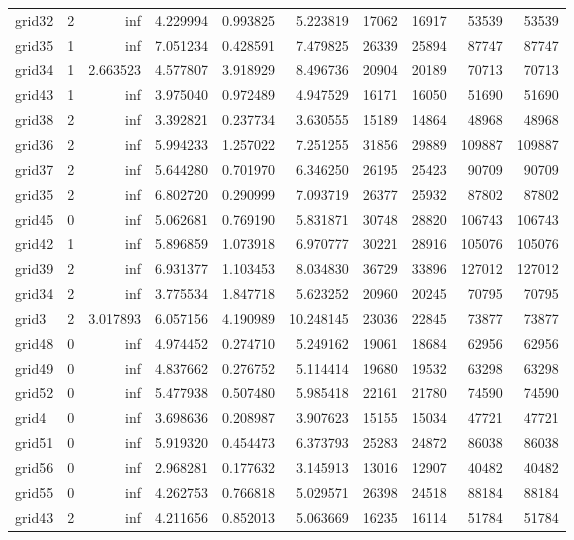 \begin{longtable}{|l|r|r|r|r|r|r|r|r|r|}
grid32 & 2 & inf & 4.229994 & 0.993825 & 5.223819 & 17062 & 16917 & 53539 & 53539 \\
grid35 & 1 & inf & 7.051234 & 0.428591 & 7.479825 & 26339 & 25894 & 87747 & 87747 \\
grid34 & 1 & 2.663523 & 4.577807 & 3.918929 & 8.496736 & 20904 & 20189 & 70713 & 70713 \\
grid43 & 1 & inf & 3.975040 & 0.972489 & 4.947529 & 16171 & 16050 & 51690 & 51690 \\
grid38 & 2 & inf & 3.392821 & 0.237734 & 3.630555 & 15189 & 14864 & 48968 & 48968 \\
grid36 & 2 & inf & 5.994233 & 1.257022 & 7.251255 & 31856 & 29889 & 109887 & 109887 \\
grid37 & 2 & inf & 5.644280 & 0.701970 & 6.346250 & 26195 & 25423 & 90709 & 90709 \\
grid35 & 2 & inf & 6.802720 & 0.290999 & 7.093719 & 26377 & 25932 & 87802 & 87802 \\
grid45 & 0 & inf & 5.062681 & 0.769190 & 5.831871 & 30748 & 28820 & 106743 & 106743 \\
grid42 & 1 & inf & 5.896859 & 1.073918 & 6.970777 & 30221 & 28916 & 105076 & 105076 \\
grid39 & 2 & inf & 6.931377 & 1.103453 & 8.034830 & 36729 & 33896 & 127012 & 127012 \\
grid34 & 2 & inf & 3.775534 & 1.847718 & 5.623252 & 20960 & 20245 & 70795 & 70795 \\
grid3 & 2 & 3.017893 & 6.057156 & 4.190989 & 10.248145 & 23036 & 22845 & 73877 & 73877 \\
grid48 & 0 & inf & 4.974452 & 0.274710 & 5.249162 & 19061 & 18684 & 62956 & 62956 \\
grid49 & 0 & inf & 4.837662 & 0.276752 & 5.114414 & 19680 & 19532 & 63298 & 63298 \\
grid52 & 0 & inf & 5.477938 & 0.507480 & 5.985418 & 22161 & 21780 & 74590 & 74590 \\
grid4 & 0 & inf & 3.698636 & 0.208987 & 3.907623 & 15155 & 15034 & 47721 & 47721 \\
grid51 & 0 & inf & 5.919320 & 0.454473 & 6.373793 & 25283 & 24872 & 86038 & 86038 \\
grid56 & 0 & inf & 2.968281 & 0.177632 & 3.145913 & 13016 & 12907 & 40482 & 40482 \\
grid55 & 0 & inf & 4.262753 & 0.766818 & 5.029571 & 26398 & 24518 & 88184 & 88184 \\
grid43 & 2 & inf & 4.211656 & 0.852013 & 5.063669 & 16235 & 16114 & 51784 & 51784 \\

\end{longtable}
